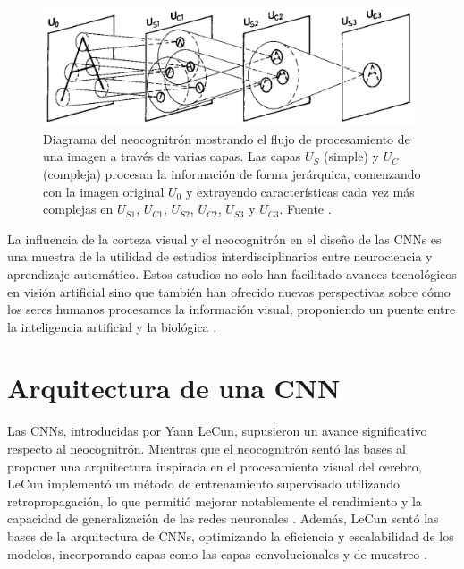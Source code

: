 \begin{figure}[h]
	\centering
	\includegraphics[width=110mm]{img/neocognitron.png}
	\caption{Diagrama del neocognitrón mostrando el flujo de procesamiento de una imagen a través de varias capas. Las capas \(U_{S}\) (simple) y \(U_{C}\) (compleja) procesan la información de forma jerárquica, comenzando con la imagen original \(U_0\) y extrayendo características cada vez más complejas en \(U_{S1}\), \(U_{C1}\), \(U_{S2}\), \(U_{C2}\), \(U_{S3}\) y \(U_{C3}\). Fuente \cite{fukushima1980neocognitron}.}
	\label{fig:neocognitron}
\end{figure}

La influencia de la corteza visual y el neocognitrón en el diseño de las CNNs es una muestra de la utilidad de estudios interdisciplinarios entre neurociencia y aprendizaje automático. Estos estudios no solo han facilitado avances tecnológicos en visión artificial sino que también han ofrecido nuevas perspectivas sobre cómo los seres humanos procesamos la información visual, proponiendo un puente entre la inteligencia artificial y la biológica \cite{serre2007feedforward}.


\section{Arquitectura de una CNN}

Las CNNs, introducidas por Yann LeCun, supusieron un avance significativo respecto al neocognitrón. Mientras que el neocognitrón sentó las bases al proponer una arquitectura inspirada en el procesamiento visual del cerebro, LeCun implementó un método de entrenamiento supervisado utilizando retropropagación, lo que permitió mejorar notablemente el rendimiento y la capacidad de generalización de las redes neuronales \cite{lecun1998gradient}. Además, LeCun sentó las bases de la arquitectura de CNNs, optimizando la eficiencia y escalabilidad de los modelos, incorporando capas como las capas convolucionales y de muestreo \cite{lecun1989backpropagation}.

